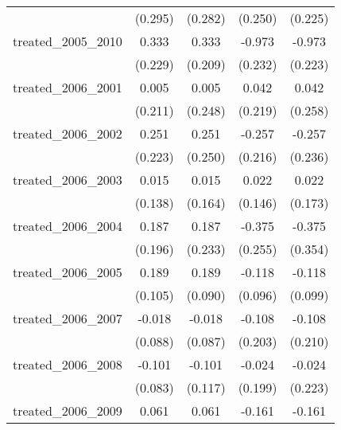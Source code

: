 {\begin{tabular}{l*{4}{c}}
            &     (0.295)         &     (0.282)         &     (0.250)         &     (0.225)         \\
[1em]
treated\_2005\_2010&       0.333         &       0.333         &      -0.973\sym{***}&      -0.973\sym{***}\\
            &     (0.229)         &     (0.209)         &     (0.232)         &     (0.223)         \\
[1em]
treated\_2006\_2001&       0.005         &       0.005         &       0.042         &       0.042         \\
            &     (0.211)         &     (0.248)         &     (0.219)         &     (0.258)         \\
[1em]
treated\_2006\_2002&       0.251         &       0.251         &      -0.257         &      -0.257         \\
            &     (0.223)         &     (0.250)         &     (0.216)         &     (0.236)         \\
[1em]
treated\_2006\_2003&       0.015         &       0.015         &       0.022         &       0.022         \\
            &     (0.138)         &     (0.164)         &     (0.146)         &     (0.173)         \\
[1em]
treated\_2006\_2004&       0.187         &       0.187         &      -0.375         &      -0.375         \\
            &     (0.196)         &     (0.233)         &     (0.255)         &     (0.354)         \\
[1em]
treated\_2006\_2005&       0.189         &       0.189\sym{*}  &      -0.118         &      -0.118         \\
            &     (0.105)         &     (0.090)         &     (0.096)         &     (0.099)         \\
[1em]
treated\_2006\_2007&      -0.018         &      -0.018         &      -0.108         &      -0.108         \\
            &     (0.088)         &     (0.087)         &     (0.203)         &     (0.210)         \\
[1em]
treated\_2006\_2008&      -0.101         &      -0.101         &      -0.024         &      -0.024         \\
            &     (0.083)         &     (0.117)         &     (0.199)         &     (0.223)         \\
[1em]
treated\_2006\_2009&       0.061         &       0.061         &      -0.161         &      -0.161         \\

\end{tabular}}
